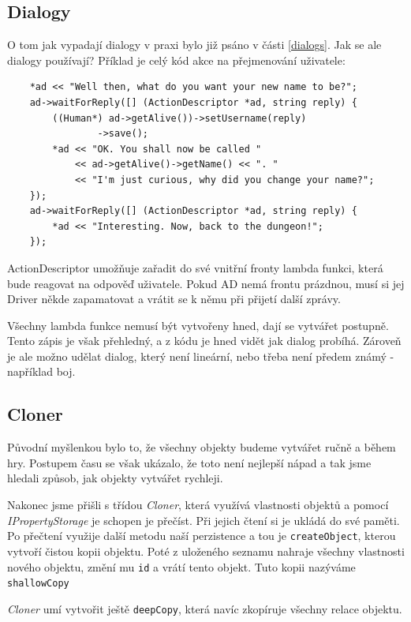 \documentclass[11pt, a4paper]{article}
\def\class#1{\emph{#1}}
\begin{document}
\subsection{Dialogy}

O tom jak vypadají dialogy v praxi bylo již psáno v části \ref{dialogs}. Jak se ale dialogy používají? Příklad je celý kód akce na přejmenování uživatele:

\begin{lstlisting}
	*ad << "Well then, what do you want your new name to be?";
	ad->waitForReply([] (ActionDescriptor *ad, string reply) {
		((Human*) ad->getAlive())->setUsername(reply)
				->save();
		*ad << "OK. You shall now be called " 
			<< ad->getAlive()->getName() << ". "
		    << "I'm just curious, why did you change your name?";
	});
	ad->waitForReply([] (ActionDescriptor *ad, string reply) {
		*ad << "Interesting. Now, back to the dungeon!";
	});
\end{lstlisting}

\noindent ActionDescriptor umožňuje zařadit do své vnitřní fronty lambda funkci, která bude reagovat na odpověď uživatele. Pokud AD nemá frontu prázdnou, musí si jej Driver někde zapamatovat a vrátit se k němu při přijetí další zprávy.

Všechny lambda funkce nemusí být vytvořeny hned, dají se vytvářet postupně. Tento zápis je však přehledný, a z kódu je hned vidět jak dialog probíhá. Zároveň je ale možno udělat dialog, který není lineární, nebo třeba není předem známý - například boj.

\subsection{Cloner}

Původní myšlenkou bylo to, že všechny objekty budeme vytvářet ručně a během hry. Postupem času se však ukázalo, že toto není nejlepší nápad a tak jsme hledali způsob, jak objekty vytvářet rychleji.

Nakonec jsme přišli s třídou \class{Cloner}, která využívá vlastnosti objektů a pomocí \class{IPropertyStorage} je schopen je přečíst. Při jejich čtení si je ukládá do své paměti. Po přečtení využije další metodu naší perzistence a tou je \texttt{createObject}, kterou vytvoří čistou kopii objektu. Poté z uloženého seznamu nahraje všechny vlastnosti nového objektu, změní mu \texttt{id} a vrátí tento objekt. Tuto kopii nazýváme \texttt{shallowCopy}

\class{Cloner} umí vytvořit ještě \texttt{deepCopy}, která navíc zkopíruje všechny relace objektu.
\end{document}
